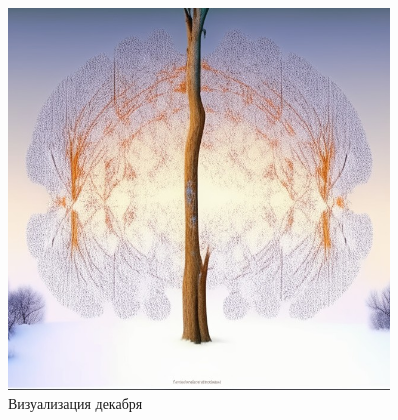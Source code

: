 \begin{figure}[H]
	\caption{Визуализация декабря}
	\includegraphics[width=0.9\textwidth]{img/dec.jpeg}
\end{figure}
